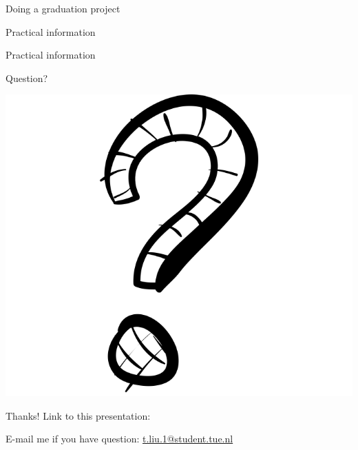 \documentclass[12pt, aspectratio=43]{beamer}
\begin{document}
\begin{frame}{Doing a graduation project}
\end{frame}

\begin{frame}{Practical information}
\end{frame}

\begin{frame}{Practical information}
\end{frame}

\begin{frame}{Question?}
\begin{center}
\includegraphics[scale=0.2]{images/Question.png}
\end{center}
\end{frame}

\begin{frame}{Thanks!}
Link to this presentation: %
\bigbreak

E-mail me if you have question: \href{mailto:t.liu.1@student.tue.nl}{t.liu.1@student.tue.nl}
\end{frame}
\end{document}
